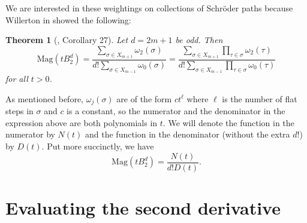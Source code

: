 \documentclass[11pt]{article}
\theoremstyle{definition}
\theoremstyle{definition}
\theoremstyle{plain}
\newtheorem{theo}[defn]{Theorem}
\theoremstyle{plain}
\theoremstyle{plain}
\theoremstyle{definition}
\begin{document}
We are interested in these weightings on collections of Schröder paths because Willerton in \cite{willerton_magnitude_2017} showed the following:

\begin{theo}[\cite{willerton_magnitude_2017}, Corollary 27]
Let $d = 2m+1$ be odd. Then
\begin{equation*}
\text{Mag}\left(tB_2^d\right) = \frac{\sum\limits_{\sigma\in X_{m+1}}\omega_2(\sigma)}{d!\sum\limits_{\sigma\in X_{m-1}}\omega_0(\sigma)} = \frac{\sum\limits_{\sigma\in X_{m+1}}\prod\limits_{\tau\in\sigma}\omega_2(\tau)}{d!\sum\limits_{\sigma\in X_{m-1}}\prod\limits_{\tau\in\sigma}\omega_0(\tau)}
\end{equation*}
for all $t > 0$.
\end{theo}
As mentioned before, $\omega_j(\sigma)$ are of the form $ct^\ell$ where $\ell$ is the number of flat steps in $\sigma$ and $c$ is a constant, so the numerator and the denominator in the expression above are both polynomials in $t$. We will denote the function in the numerator by $N(t)$ and the function in the denominator (without the extra $d!$) by $D(t)$. Put more succinctly, we have
\begin{equation*}
\text{Mag}\left(tB_2^d\right) = \frac{N(t)}{d!D(t)}.
\end{equation*}

\section{Evaluating the second derivative}
\end{document}
